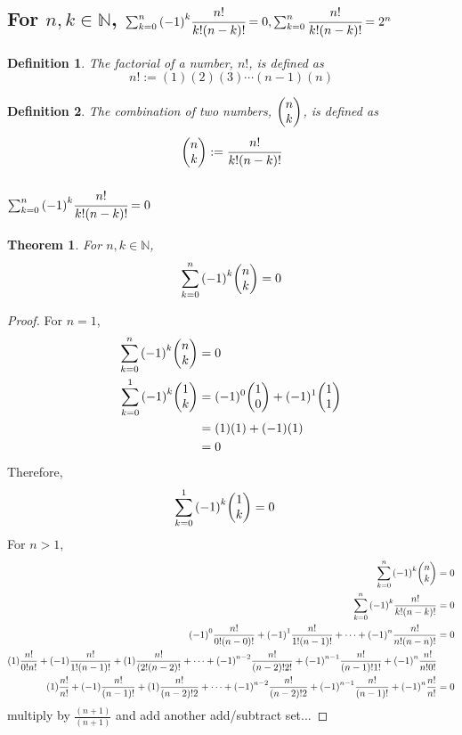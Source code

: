\documentclass[]{article}
\newcommand{\N}{\mathbb{N}}
\newtheorem{definition}{Definition}
\newtheorem{theorem}{Theorem}
\begin{document}
\newpage
\subsection{For $n,k \in \N$,
    $\sum_{k=0}^{n} \qty(-1)^k \cfrac{n!}{k!(n-k)!} = 0, 
    \sum_{k=0}^{n} \cfrac{n!}{k!(n-k)!} = 2^n$
}
\begin{definition}
    The factorial of a number, $n!$, is defined as
    $$n! := (1)(2)(3)\cdots(n-1)(n)$$
\end{definition}
\begin{definition}
    The combination of two numbers, $\mqty(n\\k)$, is defined as
    $$\mqty(n\\k) := \cfrac{n!}{k!(n-k)!}$$
\end{definition}
\subsubsection{$\sum_{k=0}^{n} \qty(-1)^k \cfrac{n!}{k!(n-k)!} = 0$}
\begin{theorem}
    For $n,k \in \N$,
    $$\sum_{k=0}^{n} \qty(-1)^k \mqty(n\\k) = 0$$
\end{theorem}
\begin{proof}
    For $n=1$,
    \begin{align*}
        \sum_{k=0}^{n} \qty(-1)^k \mqty(n\\k) &= 0\\
        \sum_{k=0}^{1} \qty(-1)^k \mqty(1\\k) 
            &= (-1)^0 \mqty(1\\0) + (-1)^1 \mqty(1\\1)\\
            &= (1)(1) + (-1) (1)\\
            &=0
    \end{align*}
    Therefore,
    \begin{align*}
        \sum_{k=0}^{1} \qty(-1)^k \mqty(1\\k) &= 0
    \end{align*}
    For $n>1$,
    \begin{align*}
        \sum_{k=0}^{n} \qty(-1)^k \mqty(n\\k) &= 0\\
        \sum_{k=0}^{n} \qty(-1)^k \frac{n!}{k!(n-k)!} &= 0\\
        \qty(-1)^0 \frac{n!}{0!(n-0)!} + \qty(-1)^1 \frac{n!}{1!(n-1)!} + \cdots +
            \qty(-1)^n \frac{n!}{n!(n-n)!} &= 0\\
        (1)\frac{n!}{0!n!} + (-1) \frac{n!}{1!(n-1)!} + (1)\frac{n!}{(2!(n-2)!} + \cdots +
            \qty(-1)^{n-2} \frac{n!}{(n-2)!2!} + \qty(-1)^{n-1} \frac{n!}{(n-1)!1!} + 
            \qty(-1)^n \frac{n!}{n!0!}\\
        (1)\frac{n!}{n!} + (-1) \frac{n!}{(n-1)!} + (1)\frac{n!}{(n-2)!2} + \cdots +
        \qty(-1)^{n-2} \frac{n!}{(n-2)!2} + \qty(-1)^{n-1} \frac{n!}{(n-1)!} 
        + \qty(-1)^n \frac{n!}{n!}&=0\\
    \end{align*}
    multiply by $\frac{(n+1)}{(n+1)}$ and add another add/subtract set...
\end{proof}
\end{document}
